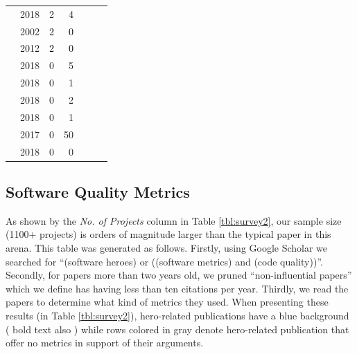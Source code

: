\documentclass[sigconf,review]{acmart}
\newcommand{\cmark}{\ding{51}}%
\newcommand{\xmark}{\ding{55}}%
\begin{document}
\begin{table}
\begin{tabular}{r|@{~}c|@{~}c|@{~}r|@{~}c|@{~}c|@{~}c}
        \cite{Jayanthi2018} & 2018 &	2 &	4   & \cmark & \cmark & \xmark \\
      \rowcolor{gray!20}  {\cite{hislop2002integrating}} &{2002} &	\textcolor{black}{2} &	\textcolor{black}{0} & \xmark & \xmark & \xmark \\
      \rowcolor{blue!10}  {\cite{morcovcomplex}} &{2012} &	 \textcolor{black}{2} &	\textcolor{black}{0} & \xmark & \xmark & \xmark \\
        \cite{10.1007/978-981-13-1927-3_48} & 2018 &	0 &	5   & \cmark & \xmark & \xmark \\
        \cite{prasad2018statistical} & 2018 &	0 &	 1  & \cmark & \cmark & \xmark \\
        \cite{dahab2018enhancing} & 2018 &	0 &	2   & \xmark & \cmark & \xmark \\
        \cite{8595100} & 2018 &	0 &	1   & \cmark & \xmark & \xmark \\
        \cite{vijay2017software} & 2017 & 0	 &	50   & \xmark & \cmark & \xmark \\
        \cite{10.1007/978-3-319-92270-6_42} & 2018 & 0	&	0  & \xmark & \cmark & \cmark \\
        
         
        
\end{tabular}
\vspace{-0.3cm}
\end{table}

 

 
\subsection{Software Quality   Metrics}\label{tion:metrics}

As shown by the {\em No. of Projects} column in Table \ref{tbl:survey2}, our sample size  
  (1100+ projects) is orders of magnitude larger than the typical paper in this arena.
This table was   generated as follows. Firstly, using Google Scholar we searched for ``(software heroes) or ((software metrics) and (code quality))''. Secondly, for papers more than two years old, we pruned ``non-influential
papers'' which we define has having less than ten citations per year. Thirdly, we read the papers to determine what kind of metrics they used.
When presenting these results (in Table \ref{tbl:survey2}),
hero-related publications have a blue background ( bold text also ) while rows colored in gray denote hero-related publication that offer no metrics in support of their arguments. 
\end{document}
